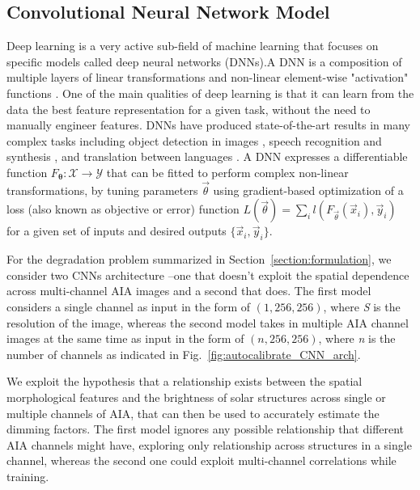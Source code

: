 \documentclass[twocolumn,usenames,dvipsnames]{aastex63}
\begin{document}
\subsection{Convolutional Neural Network Model}
\label{section:convolutional}
Deep learning is a very active sub-field of machine learning that focuses on specific models called deep neural networks (DNNs).A DNN is a composition of multiple layers of linear transformations and non-linear element-wise "activation" functions \citep{goodfellow2016deep}. One of the main qualities of deep learning is that it can learn from the data the best feature representation for a given task, without the need to manually engineer features. DNNs have produced state-of-the-art results in many complex tasks including object detection in images \citep{he2016deep}, speech recognition \citep{amodei2016deep} and synthesis \citep{oord2016wavenet}, and translation between languages \citep{wu2016google}. A DNN expresses a differentiable function $F_{\mathbf\theta}: \mathcal{X} \to \mathcal{Y}$ that can be fitted to perform complex non-linear transformations, by tuning parameters $\vec{\theta}$ using gradient-based optimization of a loss (also known as objective or error) function $L(\vec{\theta}) = \sum_i l(F_{\vec\theta}(\vec{x}_i), \vec{y}_i)$ for a given set of inputs and desired outputs $\{\vec{x}_i, \vec{y}_i\}$.

For the degradation problem summarized in Section~\ref{section:formulation}, we consider two CNNs architecture \citep{lecun1995convolutional} --one that  doesn't exploit the spatial dependence across multi-channel AIA images and a second that does. The first model considers a single channel as input in the form of $(1,256, 256)$, where \textit{S} is the resolution of the image, whereas the second model takes in multiple AIA channel images at the same time as input in the form of $(n, 256, 256)$, where \textit{n} is the number of channels as indicated in Fig.~\ref{fig:autocalibrate_CNN_arch}. 

We exploit the hypothesis that a relationship exists between the spatial morphological features and the brightness of solar structures across single or multiple channels of AIA, that can then be used to accurately estimate the dimming factors. The first model ignores any possible relationship that different AIA channels might have, exploring only relationship across structures in a single channel, whereas the second one could exploit multi-channel correlations while training.
\end{document}
